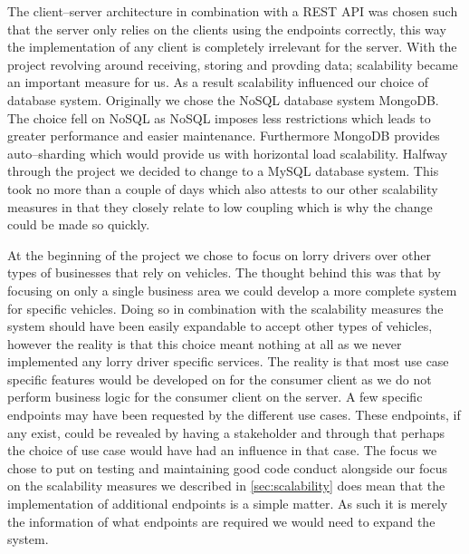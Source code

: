 \bigskip
The client--server architecture in combination with a REST API was chosen such that the server only relies on the clients using the endpoints correctly, this way the implementation of any client is completely irrelevant for the server.
With the project revolving around receiving, storing and provding data; scalability became an important measure for us.
As a result scalability influenced our choice of database system.
Originally we chose the NoSQL database system MongoDB.
The choice fell on NoSQL as NoSQL imposes less restrictions which leads to greater performance and easier maintenance.
Furthermore MongoDB provides auto--sharding which would provide us with horizontal load scalability.
Halfway through the project we decided to change to a MySQL database system. 
This took no more than a couple of days which also attests to our other scalability measures in that they closely relate to low coupling which is why the change could be made so quickly.

At the beginning of the project we chose to focus on lorry drivers over other types of businesses that rely on vehicles.
The thought behind this was that by focusing on only a single business area we could develop a more complete system for specific vehicles.
Doing so in combination with the scalability measures the system should have been easily expandable to accept other types of vehicles, however the reality is that this choice meant nothing at all as we never implemented any lorry driver specific services.
The reality is that most use case specific features would be developed on for the consumer client as we do not perform business logic for the consumer client on the server.
A few specific endpoints may have been requested by the different use cases.
These endpoints, if any exist, could be revealed by having a stakeholder and through that perhaps the choice of use case would have had an influence in that case.
The focus we chose to put on testing and maintaining good code conduct alongside our focus on the scalability measures we described in \cref{sec:scalability} does mean that the implementation of additional endpoints is a simple matter.
As such it is merely the information of what endpoints are required we would need to expand the system.

